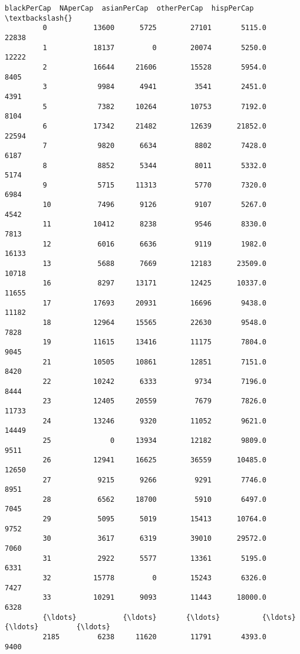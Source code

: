 \documentclass[11pt]{llncs}
\begin{document}
\begin{Verbatim}[commandchars=\\\{\}]
               blackPerCap  NAperCap  asianPerCap  otherPerCap  hispPerCap  \textbackslash{}
         0           13600      5725        27101       5115.0       22838   
         1           18137         0        20074       5250.0       12222   
         2           16644     21606        15528       5954.0        8405   
         3            9984      4941         3541       2451.0        4391   
         5            7382     10264        10753       7192.0        8104   
         6           17342     21482        12639      21852.0       22594   
         7            9820      6634         8802       7428.0        6187   
         8            8852      5344         8011       5332.0        5174   
         9            5715     11313         5770       7320.0        6984   
         10           7496      9126         9107       5267.0        4542   
         11          10412      8238         9546       8330.0        7813   
         12           6016      6636         9119       1982.0       16133   
         13           5688      7669        12183      23509.0       10718   
         16           8297     13171        12425      10337.0       11655   
         17          17693     20931        16696       9438.0       11182   
         18          12964     15565        22630       9548.0        7828   
         19          11615     13416        11175       7804.0        9045   
         21          10505     10861        12851       7151.0        8420   
         22          10242      6333         9734       7196.0        8444   
         23          12405     20559         7679       7826.0       11733   
         24          13246      9320        11052       9621.0       14449   
         25              0     13934        12182       9809.0        9511   
         26          12941     16625        36559      10485.0       12650   
         27           9215      9266         9291       7746.0        8951   
         28           6562     18700         5910       6497.0        7045   
         29           5095      5019        15413      10764.0        9752   
         30           3617      6319        39010      29572.0        7060   
         31           2922      5577        13361       5195.0        6331   
         32          15778         0        15243       6326.0        7427   
         33          10291      9093        11443      18000.0        6328   
         {\ldots}           {\ldots}       {\ldots}          {\ldots}          {\ldots}         {\ldots}   
         2185         6238     11620        11791       4393.0        9400   

\end{Verbatim}
\end{document}
